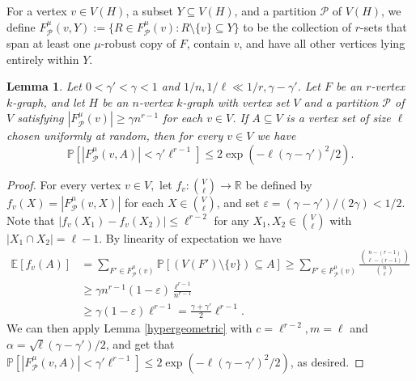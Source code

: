 \documentclass[11pt, letterpaper]{amsart}
\theoremstyle{plain}
\numberwithin{equation}{section}
\newtheorem{lemma}[thm]{Lemma}
\theoremstyle{definition}
\newcommand\card[1]{\left| #1 \right|}
\renewcommand{\vec}[1]{{\mathbf #1}}
\begin{document}
        For a vertex \(v\in V(H)\), a subset $Y\subseteq V(H)$, and a partition $\mathcal{P}$ of $V(H)$, we define $F^{\mu}_{\mathcal{P}}(v, Y):=\{R\in F^{\mu}_{\mathcal{P}}(v):R\setminus \{v\}\subseteq Y\}$ to be the collection of \(r\)-sets that span at least one \(\mu\)-robust copy of \(F\), contain $ v $, and have all other vertices lying entirely within \(Y\). 


        \begin{lemma}\label{robust edges}
               Let $0< \gamma'<\gamma<1$ and $1/n,1/\ell\ll 1/r,\gamma-\gamma'$. Let $F$ be an $r$-vertex $k$-graph, and let $H$ be an $n$-vertex $k$-graph with vertex set $V$ and a partition $\mathcal{P}$ of $V$ satisfying $ \card{F^{\mu}_{\mathcal{P}}(v)}\ge \gamma n^{r-1} $ for each $v\in V$.
               If $A\subseteq V$ is a vertex set of size $\ell$ chosen uniformly at random, then for every $v\in V$ we have \[\mathbb{P}\left[|F^{\mu}_{\mathcal{P}}(v,A)|<\gamma'{\ell}^{r-1 }\right]\le 2\exp{\left(-\ell(\gamma-\gamma')^2/2\right)}.\]
        \end{lemma}
        \begin{proof}
                For every vertex $v\in V,$ let $f_{v}:\binom{V}{\ell}\rightarrow\mathbb{R}$ be defined by $f_{v}(X)=
                |F^{\mu}_{\mathcal{P}}(v,X)|$ for each $X\in \binom{V}{\ell}$, and set $\varepsilon=(\gamma-\gamma')/(2\gamma)<1/2$. 
                Note that $|f_v(X_1)-f_v(X_2)|\le {\ell}^{r-2}$ for any $X_1,X_2\in \binom{V}{\ell}$ with $|X_1\cap X_2|=\ell-1$. By linearity of expectation we have
            \begin{equation*}
                \begin{aligned}
                    \mathbb{E}[f_{v}(A)]
                    &=\sum_{F'\in F^{\mu}_{\mathcal{P}}(v)}\mathbb{P}\left[\left(V(F')\setminus \{v\}\right)\subseteq A \right]\ge\sum_{F'\in F^{\mu}_{\mathcal{P}}(v)} \frac{\binom{n-(r-1)}{\ell-(r-1)}}{\binom{n}{\ell}}\\
                    &\ge\gamma{n}^{r-1}(1-\varepsilon)\frac{{\ell}^{r-1}}{n^{r-1}}\\
                    &\ge \gamma(1-\varepsilon){\ell}^{r-1}=\frac{\gamma+\gamma'}{2}{\ell}^{r-1}.
                \end{aligned}
            \end{equation*}
            We can then apply Lemma \ref{hypergeometric} with $c={\ell}^{r-2}, m=\ell$ and $\alpha=\sqrt{\ell}(\gamma-\gamma')/2$, and get that
            $\mathbb{P}\left[|F^{\mu}_{\mathcal{P}}(v,A)|<\gamma'{\ell}^{r-1}\right]\le 2\exp{(-\ell(\gamma-\gamma')^2/2)}$, as desired.
        \end{proof}
\end{document}
